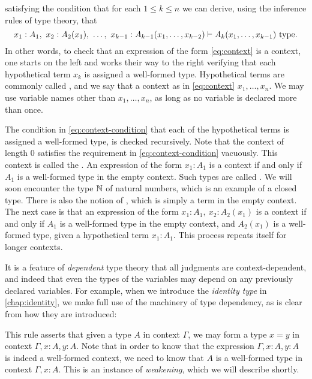 satisfying the condition that for each $1\leq k\leq n$ we can derive, using the inference rules of type theory, that
\begin{equation}\label{eq:context-condition}
  x_1:A_1,~x_2:A_2(x_1),~\ldots,~x_{k-1}:A_{k-1}(x_1,\ldots,x_{k-2})\vdash A_k(x_1,\ldots,x_{k-1})~\type.
\end{equation}
In other words, to check that an expression of the form \cref{eq:context} is a context, one starts on the left and works their way to the right verifying that each hypothetical term $x_k$ is assigned a well-formed type. Hypothetical terms are commonly called , and we say that a context as in \cref{eq:context}  $x_1,\ldots,x_n$. We may use variable names other than $x_1,\ldots,x_n$, as long as no variable is declared more than once.

The condition in \cref{eq:context-condition} that each of the hypothetical terms is assigned a well-formed type, is checked recursively. Note that the context of length $0$ satisfies the requirement in \cref{eq:context-condition} vacuously. This context is called the . An expression of the form $x_1:A_1$ is a context if and only if $A_1$ is a well-formed type in the empty context. Such types are called . We will soon encounter the type $\N$ of natural numbers, which is an example of a closed type. There is also the notion of , which is simply a term in the empty context. The next case is that an expression of the form $x_1:A_1,~x_2:A_2(x_1)$ is a context if and only if $A_1$ is a well-formed type in the empty context, and $A_2(x_1)$ is a well-formed type, given a hypothetical term $x_1:A_1$. This process repeats itself for longer contexts.

It is a feature of \emph{dependent} type theory that all judgments are context-dependent, and indeed that even the types of the variables may depend on any previously declared variables. For example, when we introduce the \emph{identity type} in \cref{chap:identity}, we make full use of the machinery of type dependency, as is clear from how they are introduced:
\begin{prooftree}
\end{prooftree}
This rule asserts that given a type $A$ in context $\Gamma$, we may form a type $x=y$ in context $\Gamma,x:A,y:A$. Note that in order to know that the expression $\Gamma,x:A,y:A$ is indeed a well-formed context, we need to know that $A$ is a well-formed type in context $\Gamma,x:A$. This is an instance of \emph{weakening}, which we will describe shortly.

